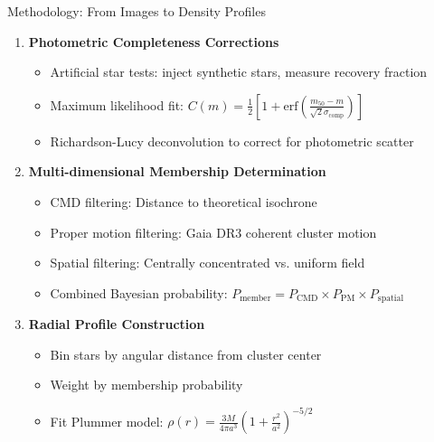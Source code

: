 \documentclass{beamer}
\begin{document}
\begin{frame}{Methodology: From Images to Density Profiles}
    \begin{enumerate}
        \item \textbf{Photometric Completeness Corrections}
        \begin{itemize}
            \item Artificial star tests: inject synthetic stars, measure recovery fraction
            \item Maximum likelihood fit: $C(m) = \frac{1}{2}\left[1 + \text{erf}\left(\frac{m_{50}-m}{\sqrt{2}\sigma_{\text{comp}}}\right)\right]$
            \item Richardson-Lucy deconvolution to correct for photometric scatter
        \end{itemize}

        \vspace{0.3cm}

        \item \textbf{Multi-dimensional Membership Determination}
        \begin{itemize}
            \item \alert{CMD filtering:} Distance to theoretical isochrone
            \item \alert{Proper motion filtering:} Gaia DR3 coherent cluster motion
            \item \alert{Spatial filtering:} Centrally concentrated vs. uniform field
            \item Combined Bayesian probability: $P_{\text{member}} = P_{\text{CMD}} \times P_{\text{PM}} \times P_{\text{spatial}}$
        \end{itemize}

        \vspace{0.3cm}

        \item \textbf{Radial Profile Construction}
        \begin{itemize}
            \item Bin stars by angular distance from cluster center
            \item Weight by membership probability
            \item Fit Plummer model: $\rho(r) = \frac{3M}{4\pi a^3}\left(1 + \frac{r^2}{a^2}\right)^{-5/2}$
        \end{itemize}
    \end{enumerate}
\end{frame}
\end{document}
